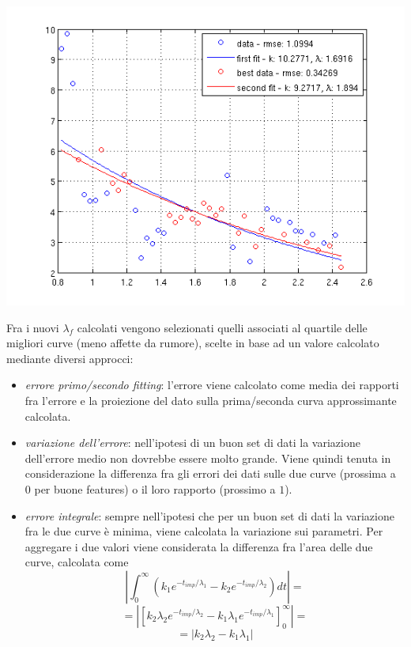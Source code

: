 \documentclass[12pt]{report}
\begin{document}
\begin{center}
	\includegraphics[scale=0.7]{images/twoFits.png}
	\label{fig:twoFits}
\end{center}

\noindent Fra i nuovi $\lambda_f$ calcolati vengono selezionati quelli associati al quartile delle migliori curve (meno affette da rumore), scelte in base ad un valore calcolato mediante diversi approcci:

\begin{itemize}
	\item	\emph{errore primo/secondo fitting}: l'errore viene calcolato come media dei rapporti fra l'errore e la proiezione del dato sulla prima/seconda curva approssimante calcolata.
	\item	\emph{variazione dell'errore}: nell'ipotesi di un buon set di dati la variazione dell'errore medio non dovrebbe essere molto grande. Viene quindi tenuta in considerazione la differenza fra gli errori dei dati sulle due curve (prossima a $0$ per buone features) o il loro rapporto (prossimo a $1$).
	\item	\emph{errore integrale}: sempre nell'ipotesi che per un buon set di dati la variazione fra le due curve \`e minima, viene calcolata la variazione sui parametri. Per aggregare i due valori viene considerata la differenza fra l'area delle due curve, calcolata come $$\left|\int^{\infty}_0\left(k_1e^{-t_{imp}/\lambda_1} - k_2e^{-t_{imp}/\lambda_2}\right)dt\right| =$$ $$= \left|\left[ k_2\lambda_2e^{-t_{imp}/\lambda_2} - k_1\lambda_1e^{-t_{imp}/\lambda_1} \right]^\infty_0\right| =$$ $$ = \left|k_2\lambda_2 - k_1\lambda_1\right|$$
\end{itemize}
\end{document}

